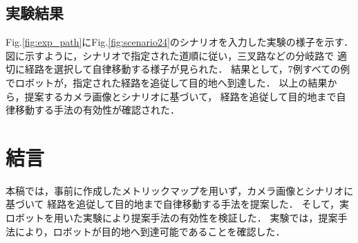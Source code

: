 \documentclass{sice-si}
\begin{document}


\subsection{実験結果}
Fig.\ref{fig:exp_path}にFig.\ref{fig:scenario24}のシナリオを入力した実験の様子を示す．
図に示すように，シナリオで指定された道順に従い，三叉路などの分岐路で
適切に経路を選択して自律移動する様子が見られた．
結果として，7例すべての例でロボットが，指定された経路を追従して目的地へ到達した．
以上の結果から，提案するカメラ画像とシナリオに基づいて，
経路を追従して目的地まで自律移動する手法の有効性が確認された．


\section{結言}
本稿では，事前に作成したメトリックマップを用いず，カメラ画像とシナリオに基づいて
経路を追従して目的地まで自律移動する手法を提案した．
そして，実ロボットを用いた実験により提案手法の有効性を検証した．
実験では，提案手法により，ロボットが目的地へ到達可能であることを確認した．
\end{document}
